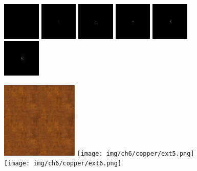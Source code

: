 \begin{figure}[!h]
\includegraphics[width=0.16\textwidth]{img/ch6/copper/freq1.png}
\includegraphics[width=0.16\textwidth]{img/ch6/copper/freq2.png}
\includegraphics[width=0.16\textwidth]{img/ch6/copper/freq3.png}
\includegraphics[width=0.16\textwidth]{img/ch6/copper/freq4.png}
\includegraphics[width=0.16\textwidth]{img/ch6/copper/freq5.png}
\includegraphics[width=0.16\textwidth]{img/ch6/copper/freq6.png}


\includegraphics[width=0.325\textwidth]{img/ch6/copper/ext4.png}
\texttt{[image: img/ch6/copper/ext5.png]}
\texttt{[image: img/ch6/copper/ext6.png]}


\end{figure}
